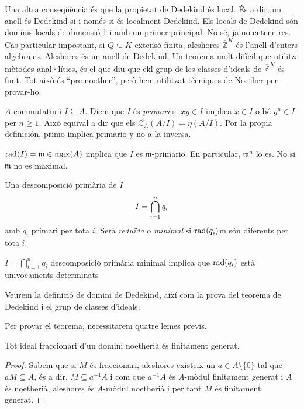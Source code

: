 \documentclass[../../../main.tex]{subfiles}
\begin{document}
Una altra conseqüència és que la propietat de Dedekind és local. És a dir, un anell és Dedekind si i només si és localment Dedekind. Els locals de Dedekind són dominis locals de dimensió 1 i amb un primer principal. No sé, ja no entenc res. Cas particular impostant, si $Q\subseteq K$ extensó finita, aleshores $\overline{\mathbb{Z}}^K$ és l'anell d'enters algebraics. Aleshores és un anell de Dedekind. Un teorema molt difícil que utilitza mètodes anal·lítics, és el que diu que ekl grup de les classes d'ideals de $\overline{\mathbb{Z}}^K$ és finit. Tot això és ``pre-noether'', però hem utilitzat tècniques de Noether per provar-ho.

$A$ commutatiu i $I\subseteq A$. Diem que $I$ és \textit{primari} si $xy\in I$ implica $x\in I$ o bé $y^n\in I$ per $n\geq1$. Això equival a dir que els $\mathcal{Z}_A(A/I) = \eta(A/I)$. Por la propia definición, primo implica primario y no a la inversa. 

$\operatorname{\mathrm{rad}}(I)=\mathfrak{m}\in\max(A)$ implica que $I$ es $\mathfrak{m}$-primario. En particular, $\mathfrak{m}^n$ lo es. No si $\mathfrak{m}$ no es maximal.

\begin{defi}
Una descomposició primària de $I$
\begin{equation}
    \notag
    I = \bigcap_{i=1}^nq_i
\end{equation}
amb $q_i$ primari per tota $i$. Serà \textit{reduïda} o \textit{minimal} si $\operatorname{\mathrm{rad}}(q_i)$m són diferents per tota $i$.
\end{defi}

\begin{ter}
$I = \bigcap_{i=1}^nq_i$ descomposició primària minimal implica que $\operatorname{\mathrm{rad}}(q_i)$ està univocaments determinats
\end{ter}
Veurem la definició de domini de Dedekind, així com la prova del teorema de Dedekind i el grup de classes d'ideals.

Per provar el teorema, necessitarem quatre lemes previs.


\begin{lema}
\label{lema:dedekind1} Tot ideal fraccionari d'un domini noetherià és finitament generat.
\end{lema}
\begin{proof}
Sabem que si $M$ és fraccionari, aleshores existeix un $a\in A\setminus\{0\}$ tal que $aM\subseteq A$, és a dir, $M\subseteq a^{-1}A$ i com que $a^{-1}A$ és $A$-mòdul finitament generat i $A$ és noetherià, aleshores és $A$-mòdul noetherià i per tant $M$ és finitament generat.
\end{proof}
\end{document}
